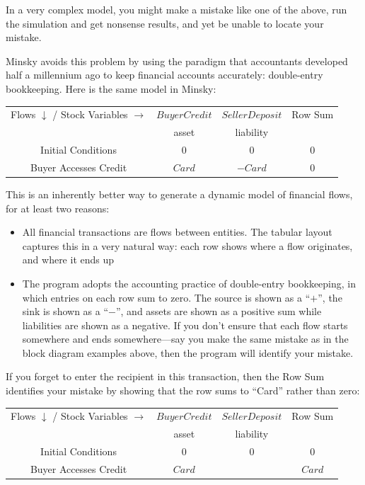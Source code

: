 In a very complex model, you might make a mistake like one of the above, run the simulation and get nonsense results, and yet be unable to locate your mistake.


Minsky avoids this problem by using the paradigm that accountants
developed half a millennium ago to keep financial accounts accurately:
double-entry bookkeeping. Here is the same model in Minsky:

\begin{center}
\begin{tabular}{|c|cc|c|}
\hline
Flows $\downarrow$ / Stock Variables
$\rightarrow$&\multicolumn{1}{|c|}{$BuyerCredit$}&\multicolumn{1}{|c|}{$SellerDeposit$}&Row Sum\\\cline{2-3}&\multicolumn{1}{|c|}{asset}&\multicolumn{1}{|c|}{liability}&\\\hline
Initial Conditions&$0$&$0$&0\\
Buyer Accesses Credit&$Card$&$-Card$&0\\
\hline
\end{tabular}
\end{center}

This is an inherently better way to generate a dynamic model of financial flows, for at least two reasons:
\begin{itemize}
\item All financial transactions are flows between entities. The
  tabular layout captures this in a very natural way: each row shows
  where a flow originates, and where it ends up
\item The program adopts the accounting practice of double-entry
  bookkeeping, in which entries on each row sum to zero. The source is
  shown as a ``$+$'', the sink is shown as a ``$-$'', and assets are shown
  as a positive sum while liabilities are shown as a negative. If you
  don't ensure that each flow starts somewhere and ends
  somewhere---say you make the same mistake as in the block diagram
  examples above, then the program will identify your mistake.
\end{itemize}

If you forget to enter the recipient in this transaction, then the Row
Sum identifies your mistake by showing that the row sums to ``Card''
rather than zero:

\begin{center}
\begin{tabular}{|c|cc|c|}
\hline
Flows $\downarrow$ / Stock Variables
$\rightarrow$&\multicolumn{1}{|c|}{$BuyerCredit$}&\multicolumn{1}{|c|}{$SellerDeposit$}&Row Sum\\\cline{2-3}&\multicolumn{1}{|c|}{asset}&\multicolumn{1}{|c|}{liability}&\\\hline
Initial Conditions&$0$&$0$&0\\
Buyer Accesses Credit&$Card$&&$Card$\\
\hline
\end{tabular}
\end{center}

